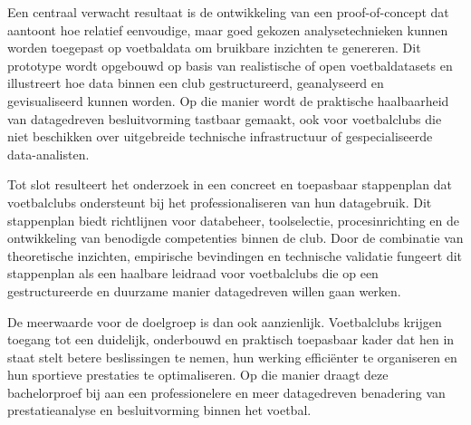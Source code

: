 Een centraal verwacht resultaat is de ontwikkeling van een proof-of-concept dat aantoont hoe relatief eenvoudige, maar goed gekozen analysetechnieken kunnen worden toegepast op voetbaldata om bruikbare inzichten te genereren.
Dit prototype wordt opgebouwd op basis van realistische of open voetbaldatasets en illustreert hoe data binnen een club gestructureerd, geanalyseerd en gevisualiseerd kunnen worden.
Op die manier wordt de praktische haalbaarheid van datagedreven besluitvorming tastbaar gemaakt, ook voor voetbalclubs die niet beschikken over uitgebreide technische infrastructuur of gespecialiseerde data-analisten.

Tot slot resulteert het onderzoek in een concreet en toepasbaar stappenplan dat voetbalclubs ondersteunt bij het professionaliseren van hun datagebruik.
Dit stappenplan biedt richtlijnen voor databeheer, toolselectie, procesinrichting en de ontwikkeling van benodigde competenties binnen de club.
Door de combinatie van theoretische inzichten, empirische bevindingen en technische validatie fungeert dit stappenplan als een haalbare leidraad voor voetbalclubs die op een gestructureerde en duurzame manier datagedreven willen gaan werken.

De meerwaarde voor de doelgroep is dan ook aanzienlijk.
Voetbalclubs krijgen toegang tot een duidelijk, onderbouwd en praktisch toepasbaar kader dat hen in staat stelt betere beslissingen te nemen, hun werking efficiënter te organiseren en hun sportieve prestaties te optimaliseren.
Op die manier draagt deze bachelorproef bij aan een professionelere en meer datagedreven benadering van prestatieanalyse en besluitvorming binnen het voetbal.
